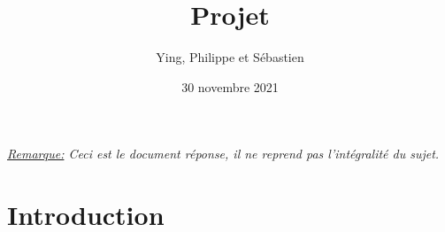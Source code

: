 \documentclass{sebaClass}
\title{Projet}
\author{Ying, Philippe et Sébastien}
\date{30 novembre 2021}
\begin{document}
\maketitle
\tableofcontents

\vspace*{\fill}
\textit{\underline{Remarque:} Ceci est le document réponse, il ne reprend pas l'intégralité du sujet.}
\newpage

\section{Introduction}

\end{document}
